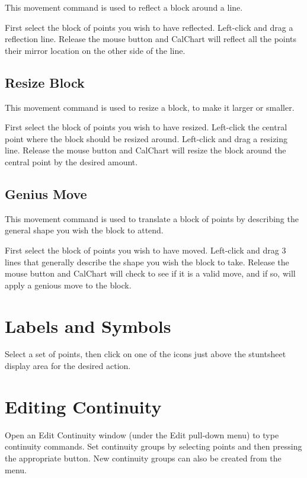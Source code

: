 This movement command is used to reflect a block around a line.

First select the block of points you wish to have reflected.  Left-click and
drag a reflection line.  Release the mouse button and CalChart
will reflect all the points their mirror location on the other side of the line.

\subsection{Resize Block}\label{resizeblock}

This movement command is used to resize a block, to make it larger or smaller.

First select the block of points you wish to have resized.  Left-click the 
central point where the block should be resized around.  Left-click and
drag a resizing line.  Release the mouse button and CalChart
will resize the block around the central point by the desired amount.

\subsection{Genius Move}\label{geniusmove}

This movement command is used to translate a block of points by describing the
general shape you wish the block to attend.

First select the block of points you wish to have moved.  Left-click and drag
3 lines that generally describe the shape you wish the block to take.
Release the mouse button and CalChart will check to see if it is a valid move,
and if so, will apply a genious move to the block.

\section{Labels and Symbols}\label{symbols}

Select a set of points, then click on one of the icons just above the
stuntsheet display area for the desired action.

\section{Editing Continuity}\label{editcont}

Open an Edit Continuity window (under the Edit pull-down menu) to type
continuity commands.  Set continuity groups by selecting points and then
pressing the appropriate button.  New continuity groups can also be
created from the menu.

